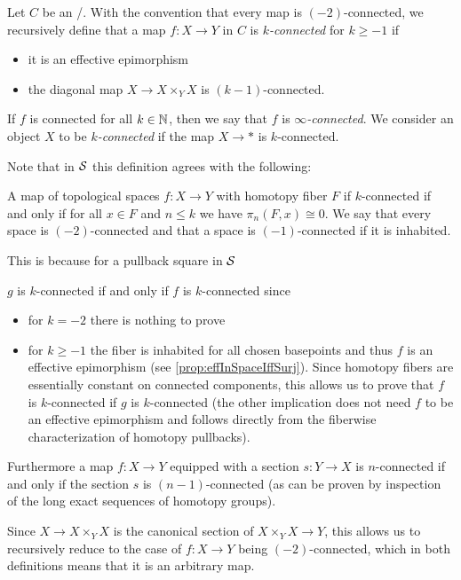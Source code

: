 \begin{definition}
    Let $C$ be an \inftytop/.
    With the convention that every map is $(-2)$-connected, we recursively define that a map $f\colon X\to Y$ in $C$ is \emph{$k$-connected} for $k\geq -1$ if
    \begin{itemize}
        \item it is an effective epimorphism
        \item the diagonal map $X\to X\times_YX$ is $(k-1)$-connected.
    \end{itemize} 
    If $f$ is connected for all $k\in\mathbb{N}$, then we say that $f$ is \emph{$\infty$-connected}.
    We consider an object $X$ to be \emph{$k$-connected} if the map $X\to *$ is $k$-connected.
\end{definition}
\begin{remark}
    Note that in $\mathcal{S}$ this definition agrees with the following:
    \begin{definition*}
        A map of topological spaces $f\colon X\to Y$ with homotopy fiber $F$ if $k$-connected if and only if for all $x\in F$ and $n\leq k$ we have $\pi_n(F,x)\cong 0$.
        We say that every space is $(-2)$-connected and that a space is $(-1)$-connected if it is inhabited.
    \end{definition*}
    This is because for a pullback square in $\mathcal{S}$ 
    \begin{center}
    \end{center}
    $g$ is $k$-connected if and only if $f$ is $k$-connected since
    \begin{itemize}
        \item for $k=-2$ there is nothing to prove
        \item for $k\geq -1$ the fiber is inhabited for all chosen basepoints and thus $f$ is an effective epimorphism (see \cref{prop:effInSpaceIffSurj}).
            Since homotopy fibers are essentially constant on connected components, this allows us to prove that $f$ is $k$-connected if $g$ is $k$-connected (the other implication does not need $f$ to be an effective epimorphism and follows directly from the fiberwise characterization of homotopy pullbacks). %
    \end{itemize}
    
    Furthermore a map $f\colon X\to Y$ equipped with a section $s\colon Y\to X$ is $n$-connected if and only if the section $s$ is $(n-1)$-connected (as can be proven by inspection of the long exact sequences of homotopy groups).
    
    Since $X\to X\times_YX$ is the canonical section of $X\times_{Y} X\to Y$, this allows us to recursively reduce to the case of $f\colon X\to Y$ being $(-2)$-connected, which in both definitions means that it is an arbitrary map.
\end{remark}
